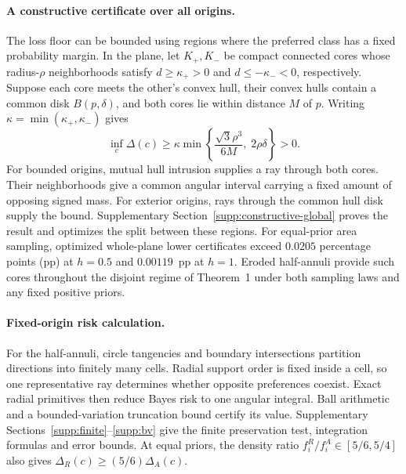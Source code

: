 \paragraph{A constructive certificate over all origins.}
The loss floor can be bounded using regions where the preferred class has a fixed probability margin. In the plane, let $K_+,K_-$ be compact connected cores whose radius-$\rho$ neighborhoods satisfy $d\geq\kappa_+>0$ and $d\leq-\kappa_-<0$, respectively. Suppose each core meets the other's convex hull, their convex hulls contain a common disk $B(p,\delta)$, and both cores lie within distance $M$ of $p$. Writing $\kappa=\min(\kappa_+,\kappa_-)$ gives
\begin{equation}
 \inf_c\Delta(c)\geq\kappa\min\left\{
 \frac{\sqrt3\rho^3}{6M},\;2\rho\delta\right\}>0.
 \label{eq:constructive-global}
\end{equation}
For bounded origins, mutual hull intrusion supplies a ray through both cores. Their neighborhoods give a common angular interval carrying a fixed amount of opposing signed mass. For exterior origins, rays through the common hull disk supply the bound. Supplementary Section~\ref{supp:constructive-global} proves the result and optimizes the split between these regions. For equal-prior area sampling, optimized whole-plane lower certificates exceed $0.0205$ percentage points (pp) at $h=0.5$ and $0.00119$~pp at $h=1$. Eroded half-annuli provide such cores throughout the disjoint regime of Theorem~1 under both sampling laws and any fixed positive priors.

\paragraph{Fixed-origin risk calculation.}
For the half-annuli, circle tangencies and boundary intersections partition directions into finitely many cells. Radial support order is fixed inside a cell, so one representative ray determines whether opposite preferences coexist. Exact radial primitives then reduce Bayes risk to one angular integral. Ball arithmetic and a bounded-variation truncation bound certify its value. Supplementary Sections~\ref{supp:finite}--\ref{supp:bv} give the finite preservation test, integration formulas and error bounds. At equal priors, the density ratio $f_i^R/f_i^A\in[5/6,5/4]$ also gives $\Delta_R(c)\geq(5/6)\Delta_A(c)$.


